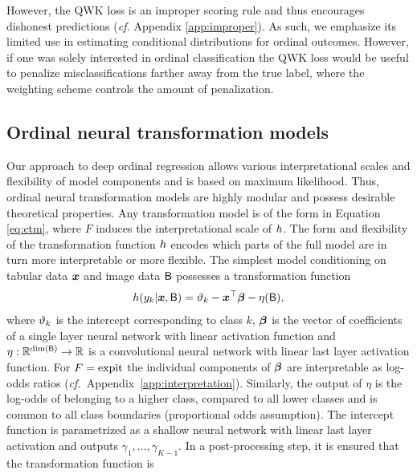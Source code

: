 \documentclass[article,nojss,shortnames]{jss}\usepackage[]{graphicx}\usepackage[]{color}
\begin{document}
However, the QWK loss is an improper scoring rule and thus encourages dishonest
predictions (\emph{cf.} Appendix \ref{app:improper}).
As such, we emphasize its limited use in estimating conditional distributions
for ordinal outcomes.
However, if one was solely interested in ordinal classification the QWK loss would be
useful to penalize misclassifications farther away from the true label, where the weighting
scheme controls the amount of penalization. %

\subsection{Ordinal neural transformation models} \label{sec:ontram}

Our approach to deep ordinal regression allows various interpretational scales
and flexibility of model components and is based on maximum likelihood.
Thus, ordinal neural transformation models are highly modular and possess desirable
theoretical properties.
Any transformation model is of the form in Equation \eqref{eq:ctm},
where $F$ induces the interpretational scale of $h$. The form and flexibility
of the transformation function $h$ encodes which parts of the full model
are in turn more interpretable or more flexible.
The simplest  model conditioning on tabular data $\boldsymbol x$ and image
data $\mathsf{B}$ possesses a transformation function
\begin{align} \label{eq:simpleontram}
  h(y_k \rvert \boldsymbol x, \mathsf{B}) = \vartheta_k - \boldsymbol x^\top\text{\boldmath$\beta$} - \eta(\mathsf{B}),
\end{align}
where $\vartheta_k$ is the intercept corresponding to class $k$, $\text{\boldmath$\beta$}$ is the
vector of coefficients of a single layer neural network with linear activation function
and $\eta : \mathbb{R}^{\dim(\mathsf{B})} \rightarrow \mathbb{R}$ is a convolutional neural network with
linear last layer activation function.
For $F = \operatorname{expit}$ the individual components of $\text{\boldmath$\beta$}$ are interpretable as
log-odds ratios \citep{tutz2011regression} (\emph{cf.}~Appendix~\ref{app:interpretation}).
Similarly, the output of $\eta$ is the log-odds of belonging to a higher class,
compared to all lower classes and is common to all class boundaries
(proportional odds assumption).
The intercept function is parametrized as a shallow neural network with linear
last layer activation and outputs $\gamma_1, \dots, \gamma_{K-1}$.
In a post-processing step, it is ensured that the transformation function is
\end{document}
